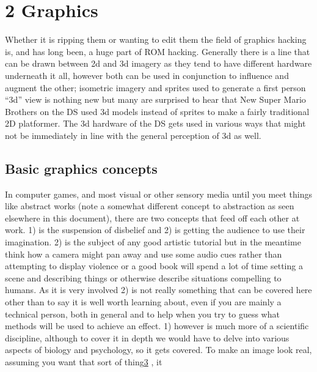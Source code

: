 \documentclass[
]{book}
\begin{document}
\hypertarget{graphics}{%
\chapter{2 Graphics}\label{graphics}}

Whether it is ripping them or wanting to edit them the field of graphics hacking is, and has long been, a huge part of ROM hacking. Generally there is a line that can be drawn between 2d and 3d imagery as they tend to have different hardware underneath it all, however both can be used in conjunction to influence and augment the other; isometric imagery and sprites used to generate a first person ``3d'' view is nothing new but many are surprised to hear that New Super Mario Brothers on the DS used 3d models instead of sprites to make a fairly traditional 2D platformer. The 3d hardware of the DS gets used in various ways that might not be immediately in line with the general perception of 3d as well.

\hypertarget{basic-graphics-concepts}{%
\section{Basic graphics concepts}\label{basic-graphics-concepts}}

In computer games, and most visual or other sensory media until you meet things like abstract works (note a somewhat different concept to abstraction as seen elsewhere in this document), there are two concepts that feed off each other at work. 1) is the suspension of disbelief and 2) is getting the audience to use their imagination. 2) is the subject of any good artistic tutorial but in the meantime think how a camera might pan away and use some audio cues rather than attempting to display violence or a good book will spend a lot of time setting a scene and describing things or otherwise describe situations compelling to humans. As it is very involved 2) is not really something that can be covered here other than to say it is well worth learning about, even if you are mainly a technical person, both in general and to help when you try to guess what methods will be used to achieve an effect. 1) however is much more of a scientific discipline, although to cover it in depth we would have to delve into various aspects of biology and psychology, so it gets covered. To make an image look real, assuming you want that sort of thing\href{romhacking20204.html\#fn3x0}{3} , it
\end{document}

